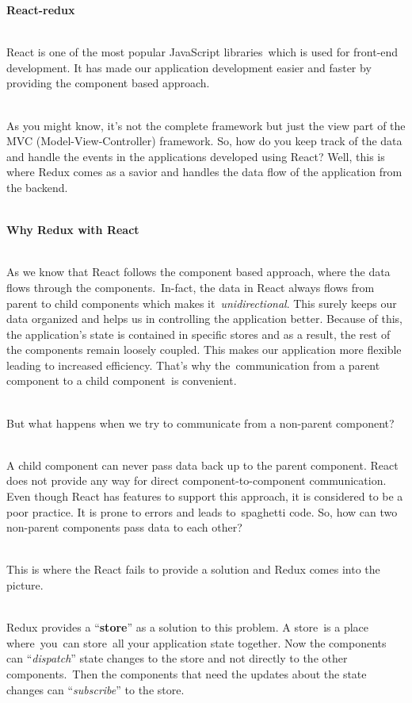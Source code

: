 \documentclass{article}
\begin{document}
\noindent \textbf{React-redux}

\noindent \textbf{}

\noindent 
\\
React is one of the most popular JavaScript libraries~which is used for front-end development. It has made our application development easier and faster by providing the component based approach.

\noindent 
\\
As you might know, it's not the complete framework but just the view part of the MVC (Model-View-Controller) framework. So, how do you keep track of the data and handle the events in the applications developed using React? Well, this is where Redux comes as a savior and handles the data flow of the application from the backend.

\noindent \\
\textbf{Why Redux with React}

\noindent \\
As we know that React follows the component based approach, where the data flows through the components.~In-fact, the data in React always flows from parent to child components which makes it~\textit{unidirectional}. This surely keeps our data organized and helps us in controlling the application better. Because of this, the application's state is contained in specific stores and as a result, the rest of the components remain loosely coupled. This makes our application more flexible leading to increased efficiency. That's why the~communication from a parent component to a child component~is convenient.

\noindent 

\noindent 

\noindent \\
But what happens when we try to communicate from a non-parent component?

\noindent\\
A child component can never pass data back up to the parent component. React does not provide any way for direct component-to-component communication. Even though React has features to support this approach, it is considered to be a poor practice. It is prone to errors and leads to~spaghetti code. So, how can two non-parent components pass data to each other?

\noindent \\
This is where the React fails to provide a solution and Redux comes into the picture.

\noindent \\
Redux provides a ``\textbf{store}'' as a solution to this problem. A store~is a place where~you~can store~all your application state together. Now the components can ``\textit{dispatch}'' state changes to the store and not directly to the other components.~Then the components that need the updates about the state changes can ``\textit{subscribe}'' to the store.
\end{document}
